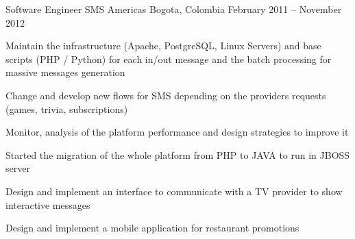 \begin{cventries}
  \cventry
    {Software Engineer} %
    {SMS Americas} %
    {Bogota, Colombia} %
    {February 2011 – November 2012 } %
    {
      \begin{cvitems} %
        \item {Maintain the infrastructure (Apache, PostgreSQL, Linux Servers) and base scripts (PHP / Python) for each in/out message and the batch processing for massive messages generation}
        \item {Change and develop new flows for SMS depending on the providers requests (games, trivia, subscriptions)}
        \item {Monitor, analysis of the platform performance and design strategies to improve it}
        \item {Started the migration of the whole platform from PHP to JAVA to run in JBOSS server}
        \item {Design and implement an interface to communicate with a TV provider to show interactive messages}
        \item {Design and implement a mobile application for restaurant promotions}
      \end{cvitems}
    }
\end{cventries}

